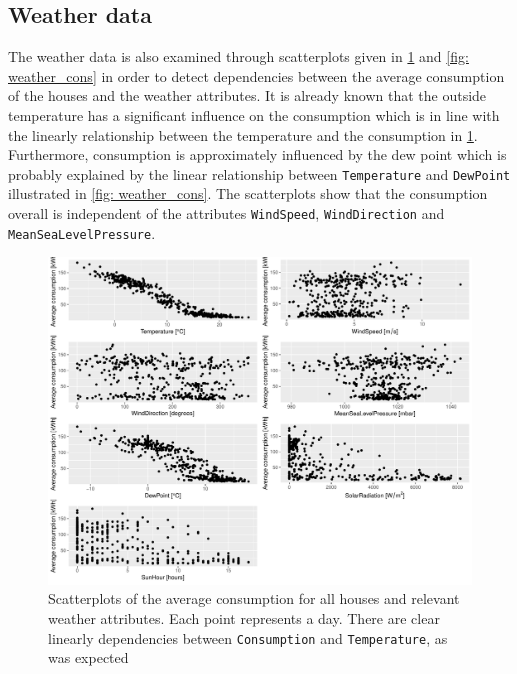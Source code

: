 
\subsection{Weather data}
The weather data is also examined through scatterplots given in \cref{fig: weatherpairs} and \cref{fig: weather_cons} in order to detect dependencies between the average consumption of the houses and the weather attributes. It is already known that the outside temperature has a significant influence on the consumption which is in line with the linearly relationship between the temperature and the consumption in \cref{fig: weatherpairs}. Furthermore, consumption is approximately influenced by the dew point which is probably explained by the linear relationship between \texttt{Temperature} and \texttt{DewPoint} illustrated in \cref{fig: weather_cons}. The scatterplots show that the consumption overall is independent of the attributes \texttt{WindSpeed}, \texttt{WindDirection} and \texttt{MeanSeaLevelPressure}. 
\begin{figure}
    \centering
    \includegraphics[width=1.\textwidth]{../../../figures/weatherpairs.pdf}
    \caption{Scatterplots of the average consumption for all houses and relevant weather attributes. Each point represents a day. There are clear linearly dependencies between \texttt{Consumption} and \texttt{Temperature}, as was expected}
    \label{fig: weatherpairs}
\end{figure}

